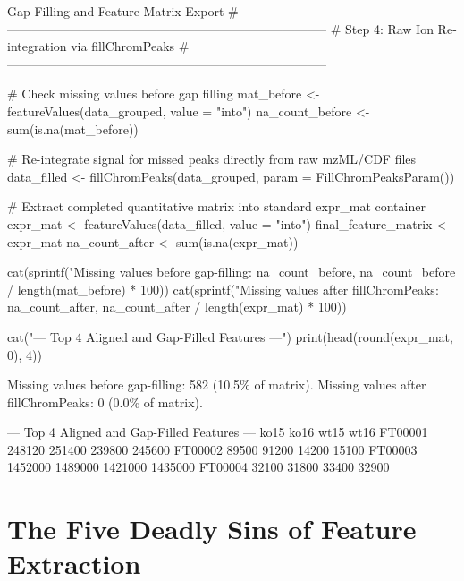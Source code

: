 \documentclass[11pt,twoside,openright]{book}
\begin{document}
\begin{rchunk}{Gap-Filling and Feature Matrix Export}
# -----------------------------------------------------------------------------
# Step 4: Raw Ion Re-integration via fillChromPeaks
# -----------------------------------------------------------------------------

# Check missing values before gap filling
mat_before <- featureValues(data_grouped, value = "into")
na_count_before <- sum(is.na(mat_before))

# Re-integrate signal for missed peaks directly from raw mzML/CDF files
data_filled <- fillChromPeaks(data_grouped, param = FillChromPeaksParam())

# Extract completed quantitative matrix into standard expr_mat container
expr_mat <- featureValues(data_filled, value = "into")
final_feature_matrix <- expr_mat
na_count_after <- sum(is.na(expr_mat))

cat(sprintf("Missing values before gap-filling: %
            na_count_before, na_count_before / length(mat_before) * 100))
cat(sprintf("Missing values after fillChromPeaks: %
            na_count_after, na_count_after / length(expr_mat) * 100))

cat("\n--- Top 4 Aligned and Gap-Filled Features ---\n")
print(head(round(expr_mat, 0), 4))
\end{rchunk}

\begin{routput}
Missing values before gap-filling: 582 (10.5\% of matrix).
Missing values after fillChromPeaks: 0 (0.0\% of matrix).

--- Top 4 Aligned and Gap-Filled Features ---
             ko15    ko16    wt15    wt16
FT00001    248120  251400  239800  245600
FT00002     89500   91200   14200   15100
FT00003   1452000 1489000 1421000 1435000
FT00004     32100   31800   33400   32900
\end{routput}

\section{The Five Deadly Sins of Feature Extraction}
\end{document}
